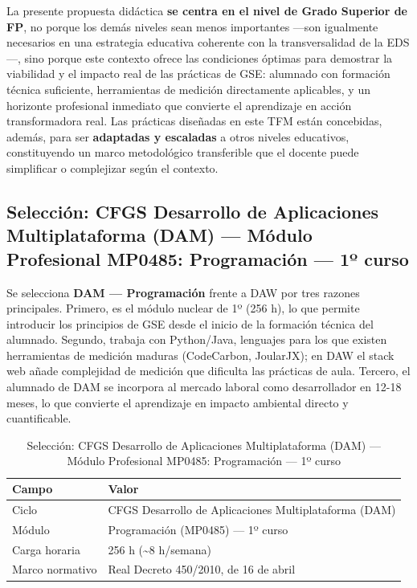 La presente propuesta didáctica \textbf{se centra en el nivel de Grado Superior de FP}, no porque los demás niveles sean menos importantes —son igualmente necesarios en una estrategia educativa coherente con la transversalidad de la EDS—, sino porque este contexto ofrece las condiciones óptimas para demostrar la viabilidad y el impacto real de las prácticas de GSE: alumnado con formación técnica suficiente, herramientas de medición directamente aplicables, y un horizonte profesional inmediato que convierte el aprendizaje en acción transformadora real. Las prácticas diseñadas en este TFM están concebidas, además, para ser \textbf{adaptadas y escaladas} a otros niveles educativos, constituyendo un marco metodológico transferible que el docente puede simplificar o complejizar según el contexto.


\subsection{Selección: CFGS Desarrollo de Aplicaciones Multiplataforma (DAM) — Módulo Profesional MP0485: Programación — 1º curso}


Se selecciona \textbf{DAM — Programación} frente a DAW por tres razones principales. Primero, es el módulo nuclear de 1º (256 h), lo que permite introducir los principios de GSE desde el inicio de la formación técnica del alumnado. Segundo, trabaja con Python/Java, lenguajes para los que existen herramientas de medición maduras (CodeCarbon, JoularJX); en DAW el stack web añade complejidad de medición que dificulta las prácticas de aula. Tercero, el alumnado de DAM se incorpora al mercado laboral como desarrollador en 12-18 meses, lo que convierte el aprendizaje en impacto ambiental directo y cuantificable.


\begin{table}[H]
\centering
\begin{tabular}{|l|p{10cm}|}
\hline
\textbf{Campo} & \textbf{Valor} \\
\hline
Ciclo & CFGS Desarrollo de Aplicaciones Multiplataforma (DAM) \\
\hline
Módulo & Programación (MP0485) — 1º curso \\
\hline
Carga horaria & 256 h (\textasciitilde{}8 h/semana) \\
\hline
Marco normativo & Real Decreto 450/2010, de 16 de abril \\
\hline
\end{tabular}
\caption{Selección: CFGS Desarrollo de Aplicaciones Multiplataforma (DAM) — Módulo Profesional MP0485: Programación — 1º curso}
\label{tab:seleccion-cfgs-desarrollo-de-aplicaciones-multipla}
\end{table}




